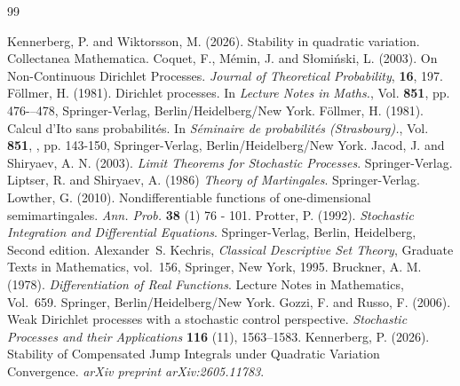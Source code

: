 \documentclass[a4paper,10pt]{article}
\begin{document}
\hfill
\begin{thebibliography}{99}

Kennerberg, P. and Wiktorsson, M. (2026).
Stability in quadratic variation.
Collectanea Mathematica.
Coquet, F., M\'emin, J. and S{\l}omi{\'n}ski, L. (2003).
On Non-Continuous Dirichlet Processes.
\textit{Journal of Theoretical Probability}, {\bf 16}, 197.
F\"ollmer, H. (1981). Dirichlet processes. In \textit{Lecture Notes in Maths.}, Vol. {\bf 851}, pp. 476-–478, Springer-Verlag, Berlin/Heidelberg/New York.
  F\"ollmer, H. (1981). Calcul d'Ito sans probabilit\'es. In \textit{S\'eminaire de probabilit\'es (Strasbourg).}, Vol. {\bf 851}, , pp. 143-150, Springer-Verlag, Berlin/Heidelberg/New York.
Jacod, J. and Shiryaev, A. N. (2003). 
\textit{Limit Theorems for Stochastic Processes}. Springer-Verlag.
Liptser, R. and Shiryaev, A. (1986) \textit{Theory of Martingales}. Springer-Verlag.
Lowther, G. (2010). Nondifferentiable functions of one-dimensional semimartingales. \textit{Ann. Prob.} {\bf 38} (1) 76 - 101.
Protter, P. (1992).	
\textit{Stochastic Integration and Differential Equations}. Springer-Verlag, Berlin, Heidelberg, Second edition.
Alexander~S. Kechris,
\emph{Classical Descriptive Set Theory},
Graduate Texts in Mathematics, vol.~156,
Springer, New York, 1995.
Bruckner, A. M. (1978).
\textit{Differentiation of Real Functions}.
Lecture Notes in Mathematics, Vol.~659.
Springer, Berlin/Heidelberg/New York.
Gozzi, F. and Russo, F. (2006).
Weak Dirichlet processes with a stochastic control perspective.
\textit{Stochastic Processes and their Applications}
{\bf 116} (11), 1563--1583.
Kennerberg, P. (2026).
Stability of Compensated Jump Integrals under Quadratic Variation Convergence.
\textit{arXiv preprint arXiv:2605.11783}.
\end {thebibliography}
\end{document}
